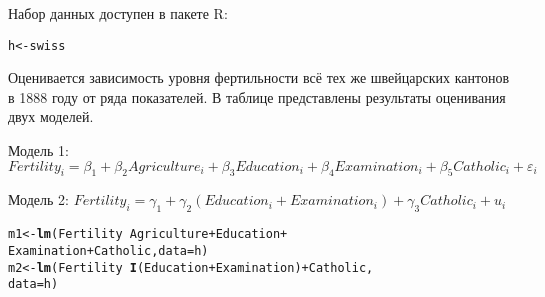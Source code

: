 \documentclass[pdftex,11pt,openany]{book}\usepackage[]{graphicx}\usepackage[]{color}
\makeatletter
\newcommand{\hlopt}[1]{\textcolor[rgb]{0,0,0}{#1}}%
\newcommand{\hlstd}[1]{\textcolor[rgb]{0.345,0.345,0.345}{#1}}%
\newcommand{\hlkwb}[1]{\textcolor[rgb]{0.69,0.353,0.396}{#1}}%
\newcommand{\hlkwc}[1]{\textcolor[rgb]{0.333,0.667,0.333}{#1}}%
\newcommand{\hlkwd}[1]{\textcolor[rgb]{0.737,0.353,0.396}{\textbf{#1}}}%
\newenvironment{kframe}{%
 \def\at@end@of@kframe{}%
 \ifinner\ifhmode%
  \def\at@end@of@kframe{\end{minipage}}%
  \begin{minipage}{\columnwidth}%
 \fi\fi%
 \def\FrameCommand##1{\hskip\@totalleftmargin \hskip-\fboxsep
 \colorbox{shadecolor}{##1}\hskip-\fboxsep
     \hskip-\linewidth \hskip-\@totalleftmargin \hskip\columnwidth}%
 \MakeFramed {\advance\hsize-\width
   \@totalleftmargin\z@ \linewidth\hsize
   \@setminipage}}%
 {\par\unskip\endMakeFramed%
 \at@end@of@kframe}
\newenvironment{knitrout}{}{} %
\makeatother
\begin{document}
\begin{problem}
Набор данных доступен в пакете R:
\begin{knitrout}
\color{fgcolor}\begin{kframe}
\begin{alltt}
\hlstd{h} \hlkwb{<-} \hlstd{swiss}
\end{alltt}
\end{kframe}
\end{knitrout}
\end{problem}

\begin{solution}
\end{solution}



\begin{problem}
 Оценивается зависимость уровня фертильности всё тех же швейцарских кантонов в 1888 году от ряда показателей. В таблице представлены результаты оценивания двух моделей.

Модель 1: $Fertility_i=\beta_1+\beta_2 Agriculture_i+\beta_3 Education_i+\beta_4 Examination_i+\beta_5 Catholic_i+\varepsilon_i$

Модель 2: $Fertility_i=\gamma_1+\gamma_2 (Education_i+Examination_i)+\gamma_3 Catholic_i+u_i$

\begin{knitrout}
\color{fgcolor}\begin{kframe}
\begin{alltt}
\hlstd{m1} \hlkwb{<-} \hlkwd{lm}\hlstd{(Fertility}\hlopt{~}\hlstd{Agriculture}\hlopt{+}\hlstd{Education}\hlopt{+}
  \hlstd{Examination}\hlopt{+}\hlstd{Catholic,}\hlkwc{data}\hlstd{=h)}
\hlstd{m2} \hlkwb{<-} \hlkwd{lm}\hlstd{(Fertility}\hlopt{~}\hlkwd{I}\hlstd{(Education}\hlopt{+}\hlstd{Examination)}\hlopt{+}\hlstd{Catholic,}
  \hlkwc{data}\hlstd{=h)}
\end{alltt}
\end{kframe}
\end{knitrout}


\end{problem}
\end{document}
